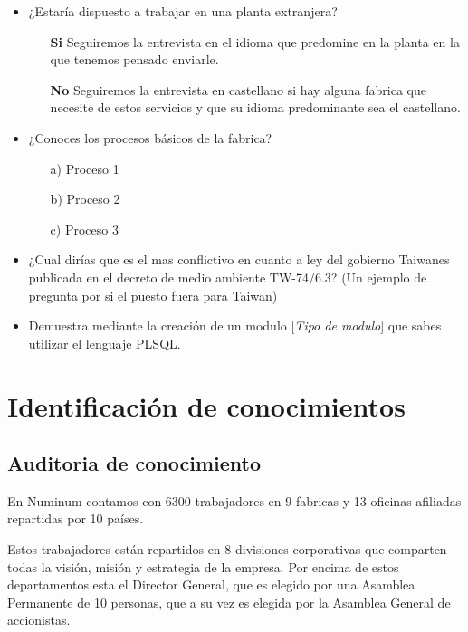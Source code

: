 \documentclass[a4paper]{article}
\begin{document}
\begin{itemize}
		\item ¿Estaría dispuesto a trabajar en una planta extranjera?
		\begin{itemize}
			\item[\textbf{Si}] Seguiremos la entrevista en el idioma que predomine en la planta en la que tenemos pensado enviarle.
			\item[\textbf{No}] Seguiremos la entrevista en castellano si hay alguna fabrica que necesite de estos servicios y que su idioma predominante sea el castellano.
		\end{itemize}
	\item ¿Conoces los procesos básicos de la fabrica?
	\begin{itemize}
		\item[a)] Proceso 1
		\item[b)] Proceso 2
		\item[c)] Proceso 3
	\end{itemize}
	
	\item ¿Cual dirías que es el mas conflictivo en cuanto a ley del gobierno Taiwanes publicada en el decreto de medio ambiente TW-74/6.3? (Un ejemplo de pregunta por si el puesto fuera para Taiwan)
	\item Demuestra mediante la creación de un modulo  [\textit{Tipo de modulo}] que sabes utilizar el lenguaje PLSQL.

\end{itemize}


\newpage

\section{Identificación de conocimientos}

\subsection{Auditoria de conocimiento}

En Numinum contamos con 6300 trabajadores en 9 fabricas y 13 oficinas afiliadas repartidas por 10 países.\par
Estos trabajadores están repartidos en 8 divisiones corporativas que comparten todas la visión, misión y estrategia de la empresa.
Por encima de estos departamentos esta el Director General, que es elegido por una Asamblea Permanente de 10 personas, que a su vez es elegida por la Asamblea General de accionistas.
\end{document}
